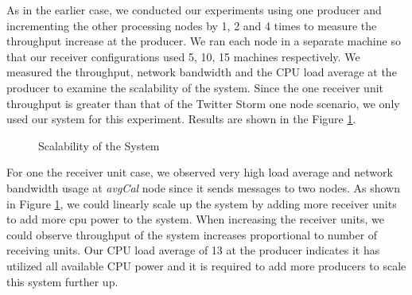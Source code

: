 As in the earlier case, we conducted our experiments using one producer and incrementing the other processing nodes by 1, 2 and 4 times to measure the throughput increase at the producer. We ran each node in a separate machine so that our receiver configurations used 5, 10, 15 machines respectively. We measured the throughput,  network bandwidth and the CPU load average at the producer to examine the scalability of the system. Since the one receiver unit throughput is greater than that of the Twitter Storm one node scenario, we only used our system for this experiment.  Results are shown in the Figure \ref{scalability}.


\begin{figure}[!t]
        \centering
        \hfil
        \hfil
        \hfil
        \caption{Scalability of the System}
        \label{scalability}
\end{figure}


For one the receiver unit case, we observed very high load average and network bandwidth usage at \textit{avgCal} node since it sends messages to two nodes. As shown in  Figure \ref{scalability}, we could linearly scale up the system by adding more receiver units to add more cpu power to the system. When increasing the receiver units, we could observe throughput of the system increases proportional to number of receiving units. Our CPU load average of 13 at the producer indicates it has utilized all available CPU power and it is required to add more producers to scale this system further up. 


